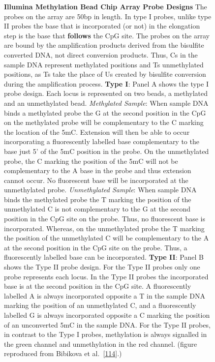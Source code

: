 \documentclass[
]{book}
\begin{document}
\begin{figure}
\caption{\textbf{Illumina Methylation Bead Chip Array Probe Designs} The probes on the array are 50bp in length. In type I probes, unlike type II probes the base that is incorporated (or not) in the elongation step is the base that \textbf{follows} the CpG site. The probes on the array are bound by the amplification products derived from the bisulfite converted DNA, not direct conversion products. Thus, Cs in the sample DNA represent methylated positions and Ts unmethylated positions, as Ts take the place of Us created by bisulfite conversion during the amplification process. \textbf{Type I}: Panel A shows the type I probe design. Each locus is represented on two beads, a methylated and an unmethylated bead. \emph{Methylated Sample}: When sample DNA binds a methylated probe the G at the second position in the CpG on the methylated probe will be complementary to the C marking the location of the 5mC. Extension will then be able to occur incorporating a fluorescently labelled base complementary to the base just 5' of the 5mC position in the probe. On the unmethylated probe, the C marking the position of the 5mC will not be complementary to the A base in the probe and thus extension cannot occur. No fluorescent base will be incorporated at the unmethylated probe. \emph{Unmethylated Sample}: When sample DNA binds the methylated probe the T marking the position of the unmethylated C is not complementary to the G at the second position in the CpG site on the probe. Thus, no fluorescent base is incorporated. Whereas, on the unmethylated probe the T marking the position of the unmethylated C will be complementary to the A at the second position in the CpG site on the probe. Thus, a fluorescently labelled base can be incorporated. \textbf{Type II}: Panel B shows the Type II probe design. For the Type II probes only one probe represents each locus. In the Type II probes the incorporated base is at the second position in the CpG site. A fluorescently labelled A is always incorporated opposite a T in the sample DNA marking the position of an unmethylated C, and a fluorescently labelled G is always incorporated opposite a C marking the position of an unconverted 5mC in the sample DNA. For the Type II probes, in contrast to the Type I probes, methylation is always signalled in the green channel and unmethylation in the red channel. (figure reproduced from Bibikova et al.~{[}\protect\hyperlink{ref-Bibikova2011}{114}{]}.)}\label{fig:Bibikova2011IlluminaMethylationBeadChip}
\end{figure}
\end{document}

